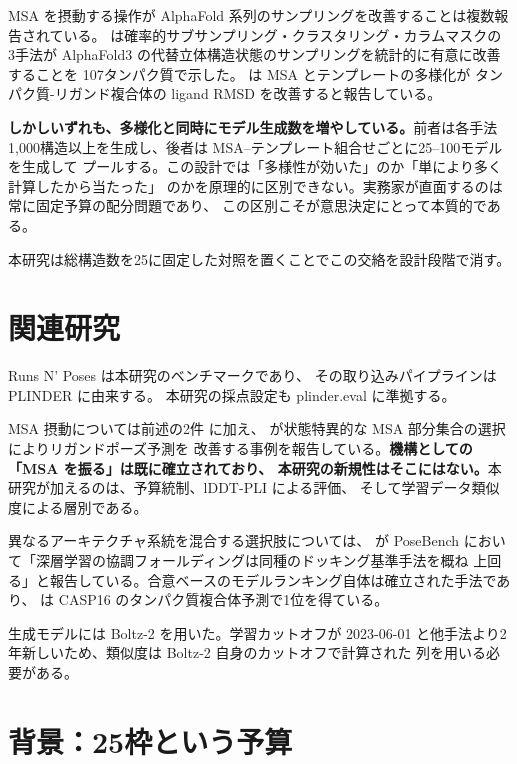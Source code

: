 \documentclass[11pt]{article}
\begin{document}
MSA を摂動する操作が AlphaFold 系列のサンプリングを改善することは複数報告されている。
\citet{lidbrink-2026-several} は確率的サブサンプリング・クラスタリング・カラムマスクの
3手法が AlphaFold3 の代替立体構造状態のサンプリングを統計的に有意に改善することを
107タンパク質で示した。\citet{neupane-2026-improving} は MSA とテンプレートの多様化が
タンパク質-リガンド複合体の ligand RMSD を改善すると報告している。

\textbf{しかしいずれも、多様化と同時にモデル生成数を増やしている。}前者は各手法
1,000構造以上を生成し、後者は MSA--テンプレート組合せごとに25--100モデルを生成して
プールする。この設計では「多様性が効いた」のか「単により多く計算したから当たった」
のかを原理的に区別できない。実務家が直面するのは常に固定予算の配分問題であり、
この区別こそが意思決定にとって本質的である。

本研究は総構造数を25に固定した対照を置くことでこの交絡を設計段階で消す。

\section{関連研究}

Runs N' Poses \citep{skrinjar-2026-have} は本研究のベンチマークであり、
その取り込みパイプラインは PLINDER \citep{durairaj-2024-plinder} に由来する。
本研究の採点設定も plinder.eval に準拠する。

MSA 摂動については前述の2件 \citep{lidbrink-2026-several,neupane-2026-improving} に加え、
\citet{xing-2025-state} が状態特異的な MSA 部分集合の選択によりリガンドポーズ予測を
改善する事例を報告している。\textbf{機構としての「MSA を振る」は既に確立されており、
本研究の新規性はそこにはない。}本研究が加えるのは、予算統制、lDDT-PLI による評価、
そして学習データ類似度による層別である。

異なるアーキテクチャ系統を混合する選択肢については、\citet{morehead-2025-assessing} が
PoseBench において「深層学習の協調フォールディングは同種のドッキング基準手法を概ね
上回る」と報告している。合意ベースのモデルランキング自体は確立された手法であり、
\citet{kagaya-2025-structure} は CASP16 のタンパク質複合体予測で1位を得ている。

生成モデルには Boltz-2 \citep{passaro-2025-boltz} を用いた。学習カットオフが
2023-06-01 と他手法より2年新しいため、類似度は Boltz-2 自身のカットオフで計算された
列を用いる必要がある。

\section{背景：25枠という予算}
\end{document}
